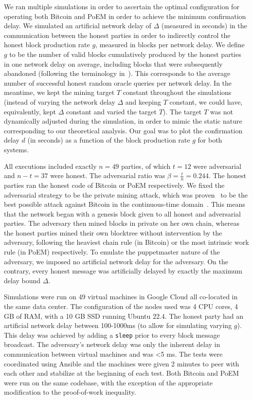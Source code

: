 We ran multiple simulations
in order to ascertain the optimal configuration for
operating both Bitcoin and PoEM in order to achieve the minimum confirmation delay.
We simulated an artificial network delay of $\Delta$ (measured in seconds) in the
communication between the honest parties in order to indirectly control the honest
block production rate $g$, measured in blocks per network delay. We define $g$ to
be the number of valid blocks cumulatively produced by the honest parties in one
network delay on average, including blocks that were subsequently abandoned
(following the terminology in~\cite{eiar}). This corresponds to the average number of
successful honest random oracle queries per network delay.
In the meantime,
we kept the mining target $T$ constant throughout the simulations (instead of varying
the network delay $\Delta$ and keeping $T$ constant, we could have, equivalently, kept
$\Delta$ constant and varied the target $T$). The target $T$ was not dynamically adjusted
during the simulation, in order to mimic the static nature corresponding to our theoretical
analysis.
Our goal was to plot the confirmation delay $d$ (in seconds) as a function of the
block production rate $g$ for both systems.

All executions included exactly
$n = 49$ parties, of which $t = 12$ were adversarial and $n - t = 37$ were honest.
The adversarial ratio was $\beta = \frac{t}{n} = 0.244$.
The honest parties ran the honest code of Bitcoin or PoEM respectively.
We fixed the adversarial strategy to be the private mining attack, which was
proven~\cite{eiar} to be the best possible attack against Bitcoin in the
continuous-time domain~\cite{bitcoin-made-simple}. This means that the network
began with a genesis block given to all honest and adversarial parties. The adversary
then mined blocks in private on her own chain, whereas the honest parties mined
their own blocktree without intervention by the adversary, following the heaviest chain
rule (in Bitcoin) or the most intrinsic work rule (in PoEM) respectively. To emulate the puppetmaster
nature of the adversary, we imposed no artificial network delay for the adversary.
On the contrary, every honest message was artificially delayed by exactly the maximum
delay bound $\Delta$.

Simulations were run on 49 virtual machines in Google Cloud all co-located in
the same data center. The configuration of the nodes used was 4 CPU cores, 4
GB of RAM, with a 10 GB SSD running Ubuntu 22.4. The honest party
had an artificial network delay between 100-1000ms (to allow for simulating varying
$g$). This delay was achieved by adding a \texttt{sleep} prior to every block message
broadcast. The adversary's network delay was only the inherent delay in communication
between virtual machines and was <5 ms. The tests were coordinated using Ansible and the
machines were given 2 minutes to peer with each other and stabilize at the beginning of
each test.
Both Bitcoin and PoEM were run on the same codebase,
with the exception of the appropriate modification to the proof-of-work inequality.


